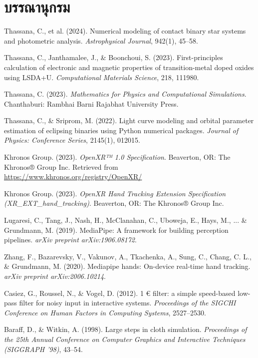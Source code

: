 \chapter*{บรรณานุกรม}

\begin{enumerate}[label={[\arabic*]}, leftmargin=2.5em, itemsep=6pt]
    \item Thassana, C., et al. (2024). Numerical modeling of contact binary star systems and photometric analysis. \textit{Astrophysical Journal}, 942(1), 45--58.
    \item Thassana, C., Janthamalee, J., \& Boonchoui, S. (2023). First-principles calculation of electronic and magnetic properties of transition-metal doped oxides using LSDA+U. \textit{Computational Materials Science}, 218, 111980.
    \item Thassana, C. (2023). \textit{Mathematics for Physics and Computational Simulations}. Chanthaburi: Rambhai Barni Rajabhat University Press.
    \item Thassana, C., \& Sriprom, M. (2022). Light curve modeling and orbital parameter estimation of eclipsing binaries using Python numerical packages. \textit{Journal of Physics: Conference Series}, 2145(1), 012015.
    \item Khronos Group. (2023). \textit{OpenXR™ 1.0 Specification}. Beaverton, OR: The Khronos® Group Inc. Retrieved from \url{https://www.khronos.org/registry/OpenXR/}
    \item Khronos Group. (2023). \textit{OpenXR Hand Tracking Extension Specification (XR\_EXT\_hand\_tracking)}. Beaverton, OR: The Khronos® Group Inc.
    \item Lugaresi, C., Tang, J., Nash, H., McClanahan, C., Uboweja, E., Hays, M., ... \& Grundmann, M. (2019). MediaPipe: A framework for building perception pipelines. \textit{arXiv preprint arXiv:1906.08172}.
    \item Zhang, F., Bazarevsky, V., Vakunov, A., Tkachenka, A., Sung, C., Chang, C. L., \& Grundmann, M. (2020). Mediapipe hands: On-device real-time hand tracking. \textit{arXiv preprint arXiv:2006.10214}.
    \item Casiez, G., Roussel, N., \& Vogel, D. (2012). 1 € filter: a simple speed-based low-pass filter for noisy input in interactive systems. \textit{Proceedings of the SIGCHI Conference on Human Factors in Computing Systems}, 2527--2530.
    \item Baraff, D., \& Witkin, A. (1998). Large steps in cloth simulation. \textit{Proceedings of the 25th Annual Conference on Computer Graphics and Interactive Techniques (SIGGRAPH '98)}, 43--54.

\end{enumerate}

